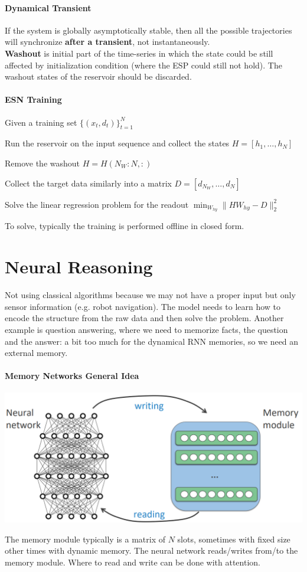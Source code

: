 \documentclass[10pt]{report}
\begin{document}
\paragraph{Dynamical Transient} If the system is globally asymptotically stable, then all the possible trajectories will synchronize \textbf{after a transient}, not instantaneously.\\
\textbf{Washout} is initial part of the time-series in which the state could be still affected by initialization condition (where the ESP could still not hold). The washout states of the reservoir should be discarded.
\paragraph{ESN Training}
\begin{list}{}{}
	\item Given a training set $\{(x_t,d_t)\}_{t=1}^N$
	\item Run the reservoir on the input sequence and collect the states $H=[h_1,\ldots,h_N]$
	\item Remove the washout $H = H(N_W:N,:)$
	\item Collect the target data similarly into a matrix $D = [d_{N_W},\ldots,d_N]$
	\item Solve the linear regression problem for the readout $\min_{W_{hy}}\|HW_{hy}-D \|^2_2$
\end{list}
To solve, typically the training is performed offline in closed form.
\section{Neural Reasoning}
Not using classical algorithms because we may not have a proper input but only sensor information (e.g. robot navigation). The model needs to learn how to encode the structure from the raw data and then solve the problem. Another example is question answering, where we need to memorize facts, the question and the answer: a bit too much for the dynamical RNN memories, so we need an external memory.
\paragraph{Memory Networks General Idea} \begin{center}
	\includegraphics[scale=0.5]{127.png}
\end{center}
The memory module typically is a matrix of $N$ slots, sometimes with fixed size other times with dynamic memory. The neural network reads/writes from/to the memory module. Where to read and write can be done with attention.
\end{document}

